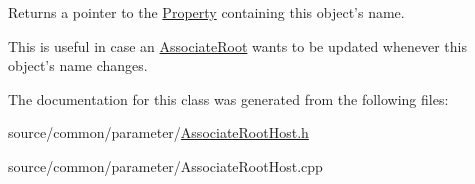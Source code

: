 Returns a pointer to the \hyperlink{class_picto_1_1_property}{Property} containing this object's name. 

This is useful in case an \hyperlink{class_picto_1_1_associate_root}{Associate\-Root} wants to be updated whenever this object's name changes. 

The documentation for this class was generated from the following files\-:\begin{DoxyCompactItemize}
\item 
source/common/parameter/\hyperlink{_associate_root_host_8h}{Associate\-Root\-Host.\-h}\item 
source/common/parameter/Associate\-Root\-Host.\-cpp\end{DoxyCompactItemize}
